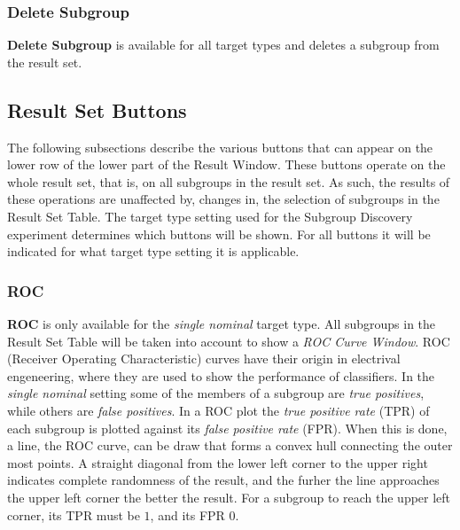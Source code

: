 \documentclass{article}
\begin{document}
\subsubsection{Delete Subgroup}
\label{result-window:delete}
\textbf{Delete Subgroup} is available for all target types and deletes a subgroup from the result set.



\subsection{Result Set Buttons}
\label{result-window:result-set-buttons}
The following subsections describe the various buttons that can appear on the lower row of the lower part of the Result Window.
These buttons operate on the whole result set, that is, on all subgroups in the result set.
As such, the results of these operations are unaffected by, changes in, the selection of subgroups in the Result Set Table.
The target type setting used for the Subgroup Discovery experiment determines which buttons will be shown.
For all buttons it will be indicated for what target type setting it is applicable.


\subsubsection{ROC}
\label{result-window:roc}
\textbf{ROC} is only available for the \emph{single nominal} target type.
All subgroups in the Result Set Table will be taken into account to show a \emph{ROC Curve Window}.
ROC (Receiver Operating Characteristic) curves have their origin in electrival engeneering, where they are used to show the performance of classifiers.
In the \emph{single nominal} setting some of the members of a subgroup are \emph{true positives}, while others are \emph{false positives}.
In a ROC plot the \emph{true positive rate} (TPR) of each subgroup is plotted against its \emph{false positive rate} (FPR).
When this is done, a line, the ROC curve, can be draw that forms a convex hull connecting the outer most points.
A straight diagonal from the lower left corner to the upper right indicates complete randomness of the result, and the furher the line approaches the upper left corner the better the result.
For a subgroup to reach the upper left corner, its TPR must be $1$, and its FPR $0$.
\end{document}
